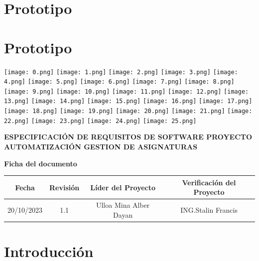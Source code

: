 \documentclass[11pt]{article}
\begin{document}
\section{Prototipo}
\section{Prototipo}
\texttt{[image: 0.png]}
\texttt{[image: 1.png]}
\texttt{[image: 2.png]}
\texttt{[image: 3.png]}
\texttt{[image: 4.png]}
\texttt{[image: 5.png]}
\texttt{[image: 6.png]}
\texttt{[image: 7.png]}
\texttt{[image: 8.png]}
\texttt{[image: 9.png]}
\texttt{[image: 10.png]}
\texttt{[image: 11.png]}
\texttt{[image: 12.png]}
\texttt{[image: 13.png]}
\texttt{[image: 14.png]}
\texttt{[image: 15.png]}
\texttt{[image: 16.png]}
\texttt{[image: 17.png]}
\texttt{[image: 18.png]}
\texttt{[image: 19.png]}
\texttt{[image: 20.png]}
\texttt{[image: 21.png]}
\texttt{[image: 22.png]}
\texttt{[image: 23.png]}
\texttt{[image: 24.png]}
\texttt{[image: 25.png]}
\newpage

\vspace{2cm} 
\begin{center}
\Huge 
\textbf{ESPECIFICACIÓN DE REQUISITOS DE SOFTWARE
PROYECTO AUTOMATIZACIÓN GESTION DE
ASIGNATURAS}
\end{center}

\newpage

\Huge
\textbf{Ficha del documento}
\vspace{7cm}

\normalsize

\begin{tabular}{|c|c|c|c|}
\hline
Fecha & Revisión & Líder del Proyecto & Verificación del Proyecto \\
\hline
\multirow{8}{*}{20/10/2023} & \multirow{8}{*}{1.1} & \multirow{8}{*}{Ulloa Mina Alber Dayan} & \multirow{8}{*}{ING.Stalin Francis} \\
& & & \\
& & & \\
& & & \\
& & & \\
& & & \\
& & & \\
& & & \\
\hline
\end{tabular}

\newpage


\section{\textbf{Introducción}}
\end{document}
